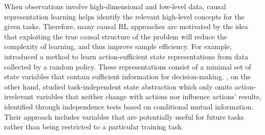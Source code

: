 \documentclass[10pt]{article} %
\theoremstyle{definition}
\begin{document}
When observations involve high-dimensional and low-level data, causal representation learning helps identify the relevant high-level concepts for the given tasks. 
Therefore, many causal RL approaches are motivated by the idea that exploiting the true causal structure of the problem will reduce the complexity of learning, and thus improve sample efficiency.
For example, \citet{huangActionSufficientStateRepresentation2022a} introduced a method to learn action-sufficient state representations from data collected by a random policy. These representations consist of a minimal set of state variables that contain sufficient information for decision-making.
\citet{wangCausalDynamicsLearning2022a}, on the other hand, studied task-independent state abstraction which only omits action-irrelevant variables that neither change with actions nor influence actions' results, identified through independence tests based on conditional mutual information. Their approach includes variables that are potentially useful for future tasks rather than being restricted to a particular training task.
\end{document}
